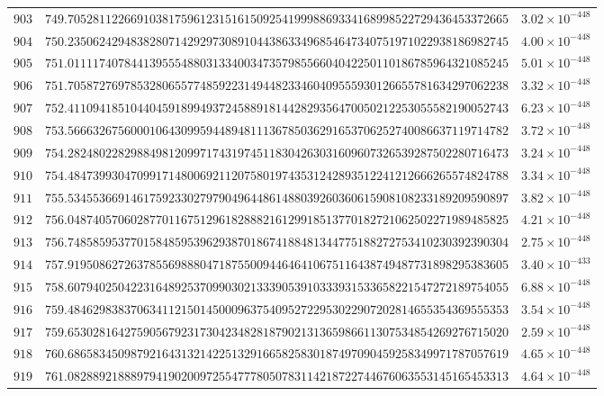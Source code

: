 \documentclass[12pt,reqno]{amsart}
\theoremstyle{remark}
\begin{document}
\begin{longtable}{clc}
$903$ & $749.7052811226691038175961231516150925419998869334168998522729436453372665$ & $3.02\times 10^{-448}$ \\
$904$ & $750.2350624294838280714292973089104438633496854647340751971022938186982745$ & $4.00\times 10^{-448}$ \\
$905$ & $751.0111174078441395554880313340034735798556604042250110186785964321085245$ & $5.01\times 10^{-448}$ \\
$906$ & $751.7058727697853280655774859223149448233460409555930126655781634297062238$ & $3.32\times 10^{-448}$ \\
$907$ & $752.4110941851044045918994937245889181442829356470050212253055582190052743$ & $6.23\times 10^{-448}$ \\
$908$ & $753.5666326756000106430995944894811136785036291653706252740086637119714782$ & $3.72\times 10^{-448}$ \\
$909$ & $754.2824802282988498120997174319745118304263031609607326539287502280716473$ & $3.24\times 10^{-448}$ \\
$910$ & $754.4847399304709917148006921120758019743531242893512241212666265574824788$ & $3.34\times 10^{-448}$ \\
$911$ & $755.5345536691461759233027979049644861488039260360615908108233189209590897$ & $3.82\times 10^{-448}$ \\
$912$ & $756.0487405706028770116751296182888216129918513770182721062502271989485825$ & $4.21\times 10^{-448}$ \\
$913$ & $756.7485859537701584859539629387018674188481344775188272753410230392390304$ & $2.75\times 10^{-448}$ \\
$914$ & $757.9195086272637855698880471875500944646410675116438749487731898295383605$ & $3.40\times 10^{-433}$ \\
$915$ & $758.6079402504223164892537099030213339053910333931533658221547272189754055$ & $6.88\times 10^{-448}$ \\
$916$ & $759.4846298383706341121501450009637540952722953022907202814655354369555353$ & $3.54\times 10^{-448}$ \\
$917$ & $759.6530281642759056792317304234828187902131365986611307534854269276715020$ & $2.59\times 10^{-448}$ \\
$918$ & $760.6865834509879216431321422513291665825830187497090459258349971787057619$ & $4.65\times 10^{-448}$ \\
$919$ & $761.0828892188897941902009725547778050783114218722744676063553145165453313$ & $4.64\times 10^{-448}$ \\

\end{longtable}
\end{document}
